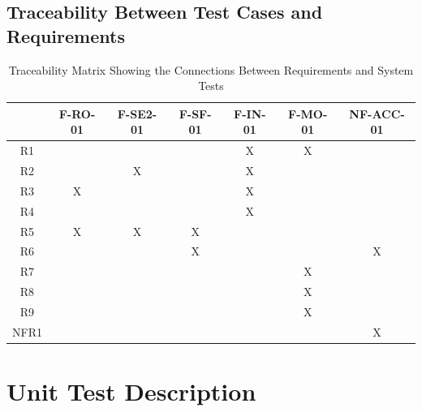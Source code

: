 \documentclass[12pt, titlepage]{article}
\begin{document}
\newpage
\subsection{Traceability Between Test Cases and Requirements}

\begin{table}[h!]
  \centering
  \begin{tabular}{|c|c|c|c|c|c|c|}
  \hline
    & F-RO-01 & F-SE2-01 & F-SF-01 & F-IN-01 & F-MO-01 & NF-ACC-01 \\
  \hline
  R1      & & & &X &X & \\ \hline
  R2      & &X & &X & & \\ \hline
  R3      &X & & &X & & \\ \hline
  R4      & & & &X & & \\ \hline
  R5      &X &X &X & & & \\ \hline
  R6      & & &X & & &X \\ \hline
  R7      & & & & &X & \\ \hline
  R8      & & & & &X & \\ \hline
  R9      & & & & &X & \\ \hline
  NFR1      & & & & & &X \\ 
  \hline
  \end{tabular}
  \caption{Traceability Matrix Showing the Connections Between Requirements and System Tests}
\end{table}


\section{Unit Test Description}\label{unit-test}



\end{document}
